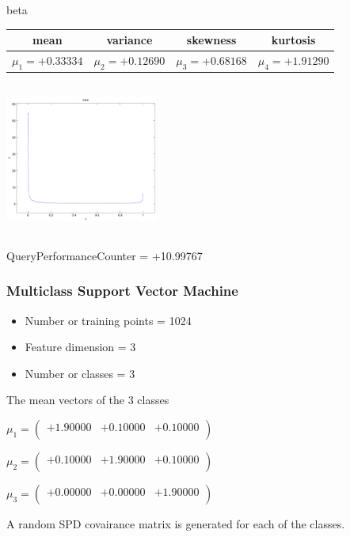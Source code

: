 \documentclass[9pt]{article}
\theoremstyle{plain}
\theoremstyle{definition}
\theoremstyle{remark}
\numberwithin{equation}{section}
\begin{document}
\newpage
beta \begin{tabular}{|c|c|c|c|}  mean & variance & skewness & kurtosis \\  \hline
$\mu_1 = +0.33334$ & $\mu_2 = +0.12690$ & $\mu_3 = +0.68168$ & $\mu_4 =+1.91290$ \\
\end{tabular}

\includegraphics[width=5cm,height=5cm]{beta.pdf}

QueryPerformanceCounter  =  +10.99767
\subsubsection{Multiclass Support Vector Machine }
\begin{itemize}
\item Number or training points = 1024
\item Feature dimension = 3
\item Number or classes = 3
\end{itemize}
{The mean vectors of the 3 classes}

$\mu_1 = \left(
\begin{array}{
ccc}
+1.90000 & +0.10000 & +0.10000 \\
\end{array}
\right)$ \newline 

$\mu_2 = \left(
\begin{array}{
ccc}
+0.10000 & +1.90000 & +0.10000 \\
\end{array}
\right)$ \newline 

$\mu_3 = \left(
\begin{array}{
ccc}
+0.00000 & +0.00000 & +1.90000 \\
\end{array}
\right)$ \newline 

A random SPD covairance matrix is generated for each of the classes.\newline
\end{document}
